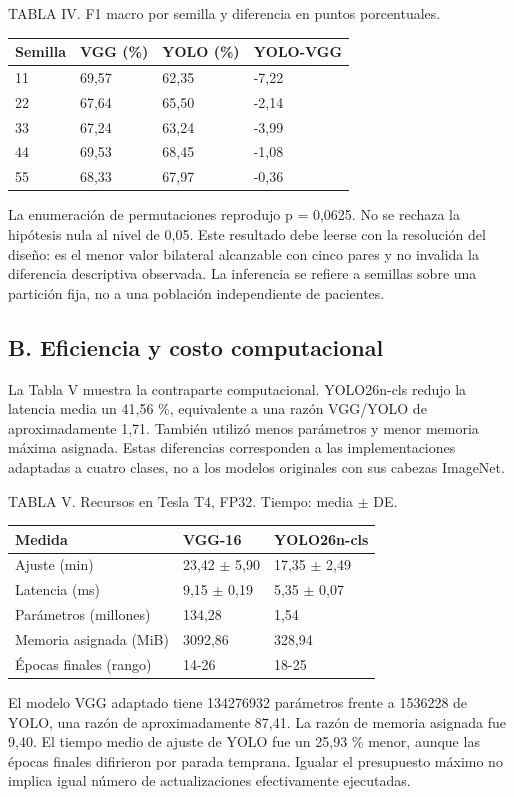 \documentclass[conference]{IEEEtran}
\begin{document}
\begin{center}\small
TABLA IV. F1 macro por semilla y diferencia en puntos porcentuales.\par\medskip
\begin{tabular}{llll}
\toprule
Semilla & VGG (\%) & YOLO (\%) & YOLO-VGG\\\midrule
11 & 69,57 & 62,35 & -7,22\\
22 & 67,64 & 65,50 & -2,14\\
33 & 67,24 & 63,24 & -3,99\\
44 & 69,53 & 68,45 & -1,08\\
55 & 68,33 & 67,97 & -0,36\\
\bottomrule\end{tabular}\end{center}
La enumeración de permutaciones reprodujo p = 0,0625. No se rechaza la hipótesis nula al nivel de 0,05. Este resultado debe leerse con la resolución del diseño: es el menor valor bilateral alcanzable con cinco pares y no invalida la diferencia descriptiva observada. La inferencia se refiere a semillas sobre una partición fija, no a una población independiente de pacientes.

\newpage
\subsection*{B. Eficiencia y costo computacional}
La Tabla V muestra la contraparte computacional. YOLO26n-cls redujo la latencia media un 41,56 \%, equivalente a una razón VGG/YOLO de aproximadamente 1,71. También utilizó menos parámetros y menor memoria máxima asignada. Estas diferencias corresponden a las implementaciones adaptadas a cuatro clases, no a los modelos originales con sus cabezas ImageNet.

\begin{center}\small
TABLA V. Recursos en Tesla T4, FP32. Tiempo: media $\pm$ DE.\par\medskip
\begin{tabular}{lll}
\toprule
Medida & VGG-16 & YOLO26n-cls\\\midrule
Ajuste (min) & 23,42 $\pm$ 5,90 & 17,35 $\pm$ 2,49\\
Latencia (ms) & 9,15 $\pm$ 0,19 & 5,35 $\pm$ 0,07\\
Parámetros (millones) & 134,28 & 1,54\\
Memoria asignada (MiB) & 3092,86 & 328,94\\
Épocas finales (rango) & 14-26 & 18-25\\
\bottomrule\end{tabular}\end{center}
El modelo VGG adaptado tiene 134276932 parámetros frente a 1536228 de YOLO, una razón de aproximadamente 87,41. La razón de memoria asignada fue 9,40. El tiempo medio de ajuste de YOLO fue un 25,93 \% menor, aunque las épocas finales difirieron por parada temprana. Igualar el presupuesto máximo no implica igual número de actualizaciones efectivamente ejecutadas.
\end{document}
